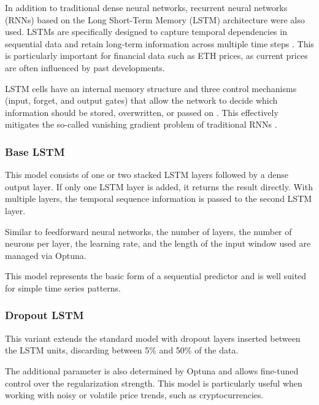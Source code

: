 In addition to traditional dense neural networks, recurrent neural networks (RNNs) based on the Long Short-Term Memory (LSTM) architecture were also used.
LSTMs are specifically designed to capture temporal dependencies in sequential data and retain long-term information across multiple time steps \cite{lstm-usage}.
This is particularly important for financial data such as ETH prices, as current prices are often influenced by past developments.

LSTM cells have an internal memory structure and three control mechanisms (input, forget, and output gates) that allow the network to decide which information should be stored, overwritten, or passed on \cite{lstm-cell}.
This effectively mitigates the so-called vanishing gradient problem of traditional RNNs \cite{lstm-gradient-problem}.

\subsubsection{Base LSTM}

This model consists of one or two stacked LSTM layers followed by a dense output layer.
If only one LSTM layer is added, it returns the result directly.
With multiple layers, the temporal sequence information is passed to the second LSTM layer.

Similar to feedforward neural networks, the number of layers, the number of neurons per layer, the learning rate, and the length of the input window used are managed via Optuna.

This model represents the basic form of a sequential predictor and is well suited for simple time series patterns.



\subsubsection{Dropout LSTM}

This variant extends the standard model with dropout layers inserted between the LSTM units, discarding between 5\% and 50\% of the data.

The additional parameter is also determined by Optuna and allows fine-tuned control over the regularization strength.
This model is particularly useful when working with noisy or volatile price trends, such as cryptocurrencies.



